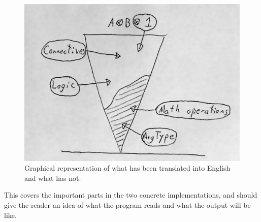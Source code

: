 \begin{figure}[h!]
  \centering
\includegraphics{Images/Picture_01}
\caption{Graphical representation of what has been translated into English and what has not.}
\label{fig:translation}
\end{figure}

This covers the important parts in the two concrete implementations, and should give the reader an idea of what the program reads and what the output will be like.